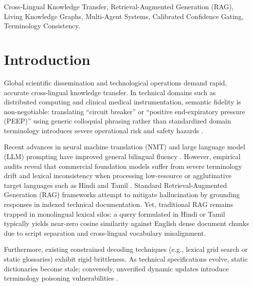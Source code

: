\documentclass[conference]{IEEEtran}
\begin{document}
\begin{IEEEkeywords}
Cross-Lingual Knowledge Transfer, Retrieval-Augmented Generation (RAG), Living Knowledge Graphs, Multi-Agent Systems, Calibrated Confidence Gating, Terminology Consistency.
\end{IEEEkeywords}

\section{Introduction}
Global scientific dissemination and technological operations demand rapid, accurate cross-lingual knowledge transfer. In technical domains such as distributed computing and clinical medical instrumentation, semantic fidelity is non-negotiable: translating ``circuit breaker'' or ``positive end-expiratory pressure (PEEP)'' using generic colloquial phrasing rather than standardized domain terminology introduces severe operational risk and safety hazards \cite{post2018call, dabre2020survey}.

Recent advances in neural machine translation (NMT) and large language model (LLM) prompting have improved general bilingual fluency \cite{vaswani2017attention, brown2020language}. However, empirical audits reveal that commercial foundation models suffer from severe terminology drift and lexical inconsistency when processing low-resource or agglutinative target languages such as Hindi and Tamil \cite{lewis2020retrieval}. Standard Retrieval-Augmented Generation (RAG) frameworks attempt to mitigate hallucination by grounding responses in indexed technical documentation. Yet, traditional RAG remains trapped in monolingual lexical silos: a query formulated in Hindi or Tamil typically yields near-zero cosine similarity against English dense document chunks due to script separation and cross-lingual vocabulary misalignment.

Furthermore, existing constrained decoding techniques (e.g., lexical grid search or static glossaries) exhibit rigid brittleness. As technical specifications evolve, static dictionaries become stale; conversely, unverified dynamic updates introduce terminology poisoning vulnerabilities \cite{shuster2021retrieval}.
\end{document}
